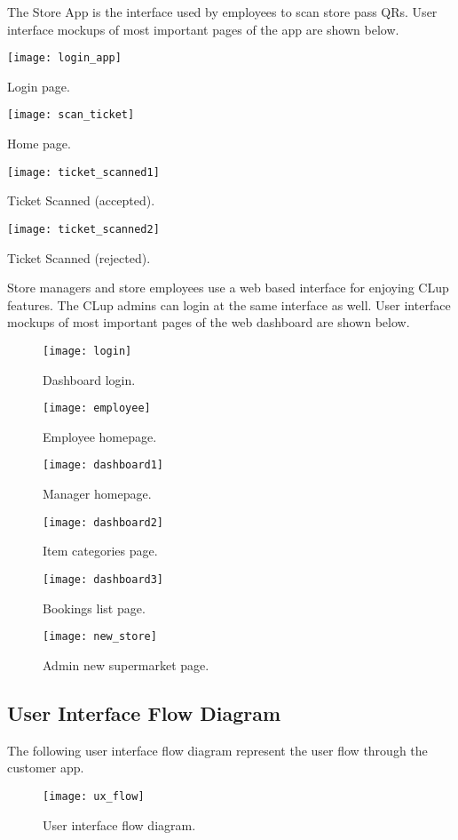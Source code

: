 \clearpage
The Store App is the interface used by employees to scan store pass QRs.
User interface mockups of most important pages of the app are shown below.
\vspace{0.5cm}

\begin{minipage}{.5\textwidth}
	\centering
	\texttt{[image: login\_app]}
	\captionsetup{type=figure}
	\caption{Login page.}
\end{minipage}%
\begin{minipage}{.5\textwidth}
	\centering
	\texttt{[image: scan\_ticket]}
	\captionsetup{type=figure}
	\caption{Home page.}
\end{minipage}

\vspace{1cm}

\begin{minipage}{.5\textwidth}
	\centering
	\texttt{[image: ticket\_scanned1]}
	\captionsetup{type=figure}
	\caption{Ticket Scanned (accepted).}
\end{minipage}%
\begin{minipage}{.5\textwidth}
	\centering
	\texttt{[image: ticket\_scanned2]}
	\captionsetup{type=figure}
	\caption{Ticket Scanned (rejected).}
\end{minipage}

\clearpage

Store managers and store employees use a web based interface for enjoying CLup features. The CLup admins can login at the same interface as well.
User interface mockups of most important pages of the web dashboard are shown below.
\vspace{0.5cm}
\begin{figure}[H]
	\centering
	\texttt{[image: login]}
	\caption{Dashboard login.}
\end{figure}
\begin{figure}[H]
	\centering
	\texttt{[image: employee]}
	\caption{Employee homepage.}
\end{figure}
\begin{figure}[H]
	\centering
	\texttt{[image: dashboard1]}
	\caption{Manager homepage.}
\end{figure}
\begin{figure}[H]
	\centering
	\texttt{[image: dashboard2]}
	\caption{Item categories page.}
\end{figure}
\begin{figure}[H]
	\centering
	\texttt{[image: dashboard3]}
	\caption{Bookings list page.}
\end{figure}
\begin{figure}[H]
	\centering
	\texttt{[image: new\_store]}
	\caption{Admin new supermarket page.}
\end{figure}

\clearpage

\subsection{User Interface Flow Diagram}
The following user interface flow diagram represent the user flow through the customer app.
\begin{figure}[H]
	\centering
	\texttt{[image: ux\_flow]}
	\caption{User interface flow diagram.}
\end{figure}